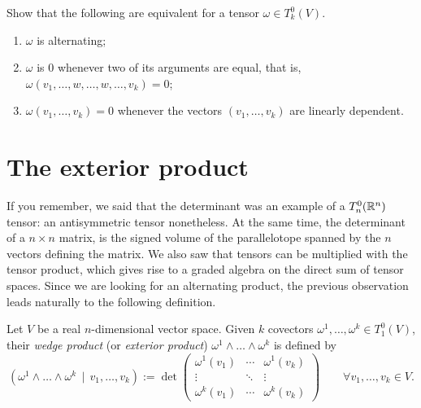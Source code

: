 \begin{exercise}\label{ex:propAlt}
	Show that the following are equivalent for a tensor $\omega\in T_k^0(V)$.
	\begin{enumerate}
		\item $\omega$ is alternating;
		\item $\omega$ is $0$ whenever two of its arguments are equal, that is, ${\omega(v_1, \ldots, w, \ldots, w, \ldots, v_k) = 0}$;
		\item $\omega(v_1, \ldots, v_k) = 0$ whenever the vectors $(v_1, \ldots, v_k)$ are linearly dependent.
	\end{enumerate}
\end{exercise}

\section{The exterior product}

If you remember, we said that the determinant was an example of a $T_n^0(\mathbb{R}^n)$ tensor: an antisymmetric tensor nonetheless.
At the same time, the determinant of a $n\times n$ matrix, is the signed volume of the parallelotope spanned by the $n$ vectors defining the matrix.
We also saw that tensors can be multiplied with the tensor product, which gives rise to a graded algebra on the direct sum of tensor spaces.
Since we are looking for an alternating product, the previous observation leads naturally to the following definition.

\begin{definition}
	Let $V$ be a real $n$-dimensional vector space.
	Given $k$ covectors $\omega^1, \ldots, \omega^k\in T_1^0(V)$, their \emph{wedge product} (or \emph{exterior product}) $\omega^1\wedge\ldots\wedge\omega^k$ is defined by
	\begin{equation}
		\left(
		\omega^1\wedge\ldots\wedge\omega^k\,\mid\, v_1,\ldots,v_k
		\right) := \det\begin{pmatrix}
			\omega^1(v_1) & \cdots & \omega^1(v_k) \\
			\vdots        & \ddots & \vdots        \\
			\omega^k(v_1) & \cdots & \omega^k(v_k)
		\end{pmatrix} \qquad
		\forall v_1,\ldots,v_k\in V.
	\end{equation}
\end{definition}

